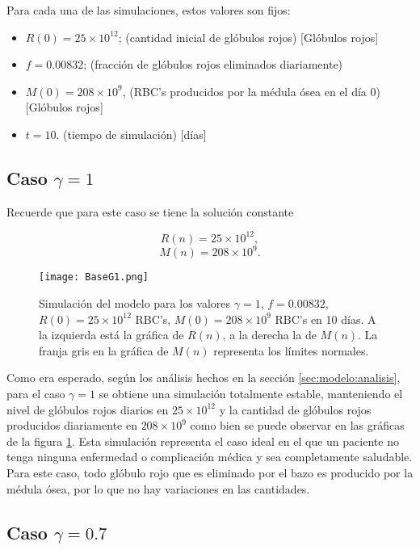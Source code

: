 Para cada una de las simulaciones, estos valores son fijos:
\begin{itemize}
    \item $R(0) = 25\times 10^{12}$; (cantidad inicial de glóbulos rojos) [Glóbulos rojos]
    \item $f=0.00832$; (fracción de glóbulos rojos eliminados diariamente)
    \item $M(0) = 208 \times 10^{9}$, (RBC's producidos por la médula ósea en el día 0) [Glóbulos rojos]
    \item $t=10$. (tiempo de simulación) [días]
\end{itemize}

\subsection{Caso $\gamma=1$}\label{subsec:modelo:simulaciones:G1}

Recuerde que para este caso se tiene la solución constante

$$R(n)=25\times 10^{12},$$
$$M(n)=208\times 10^{9}.$$


\begin{figure}[H]
    \centering
    \captionsetup{justification=centering}
    \texttt{[image: BaseG1.png]}
    \caption{Simulación del modelo para los valores $\gamma = 1$, $f = 0.00832$, $R(0) = 25\times 10^{12}$ RBC's, $M(0) = 208 \times 10^{9}$ RBC's en 10 días. A la izquierda está la gráfica de $R(n)$, a la derecha la de $M(n)$. La franja gris en la gráfica de $M(n)$ representa los límites normales.}
    \label{sec:modelo:fig:G1}
\end{figure}

Como era esperado, según los análisis hechos en la sección \ref{sec:modelo:analisis}, para el caso $\gamma = 1$ se obtiene una simulación totalmente estable, manteniendo el nivel de glóbulos rojos diarios en $25\times 10^{12}$ y la cantidad de glóbulos rojos producidos diariamente en $208\times 10^{9}$ como bien se puede observar en las gráficas de la figura \ref{sec:modelo:fig:G1}. Esta simulación representa el caso ideal en el que un paciente no tenga ninguna enfermedad o complicación médica y sea completamente saludable. Para este caso, todo glóbulo rojo que es eliminado por el bazo es producido por la médula ósea, por lo que no hay variaciones en las cantidades.

\subsection{Caso $\gamma=0.7$}

